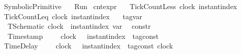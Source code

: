 %
\begin{isabellebody}%
%
%
\isadelimtheory
%
\endisadelimtheory
%
\isatagtheory
{}\isamarkupfalse%
\ SymbolicPrimitive\isanewline
\ \ \ Run\isanewline
\isanewline
{}%
\endisatagtheory
{\isafoldtheory}%
%
\isadelimtheory
\isanewline
%
\endisadelimtheory
{}\isamarkupfalse%
\ cnt{\isacharunderscore}expr\ {\isacharequal}\isanewline
\ \ TickCountLess\ {\isacartoucheopen}clock{\isacartoucheclose}\ {\isacartoucheopen}instant{\isacharunderscore}index{\isacartoucheclose}\ {\isacharparenleft}{\isachardoublequoteopen}{\isacharhash}\isactrlsup {\isacharless}{\isachardoublequoteclose}{\isacharparenright}\isanewline
{\isacharbar}\ TickCountLeq\ {\isacartoucheopen}clock{\isacartoucheclose}\ {\isacartoucheopen}instant{\isacharunderscore}index{\isacartoucheclose}\ \ {\isacharparenleft}{\isachardoublequoteopen}{\isacharhash}\isactrlsup {\isasymle}{\isachardoublequoteclose}{\isacharparenright}%
\isadelimdocument
%
\endisadelimdocument
%
\isatagdocument
%
\isamarkuptrue%
%
\endisatagdocument
{\isafolddocument}%
%
\isadelimdocument
%
\endisadelimdocument
{}\isamarkupfalse%
\ tag{\isacharunderscore}var\ {\isacharequal}\isanewline
\ \ TSchematic\ {\isacartoucheopen}clock\ {\isacharasterisk}\ instant{\isacharunderscore}index{\isacartoucheclose}\ {\isacharparenleft}{\isachardoublequoteopen}{\isasymtau}\isactrlsub v\isactrlsub a\isactrlsub r{\isachardoublequoteclose}{\isacharparenright}\isanewline
\isanewline
{}\isamarkupfalse%
\ {\isacharprime}{\isasymtau}\ constr\ {\isacharequal}\isanewline
\ \ Timestamp\ \ \ \ \ {\isacartoucheopen}clock{\isacartoucheclose}\ \ \ {\isacartoucheopen}instant{\isacharunderscore}index{\isacartoucheclose}\ {\isacartoucheopen}{\isacharprime}{\isasymtau}\ tag{\isacharunderscore}const{\isacartoucheclose}\ \ \ \ \ \ \ \ \ {\isacharparenleft}{\isachardoublequoteopen}{\isacharunderscore}\ {\isasymDown}\ {\isacharunderscore}\ {\isacharat}\ {\isacharunderscore}{\isachardoublequoteclose}{\isacharparenright}\isanewline
{\isacharbar}\ TimeDelay\ \ \ \ \ {\isacartoucheopen}clock{\isacartoucheclose}\ \ \ {\isacartoucheopen}instant{\isacharunderscore}index{\isacartoucheclose}\ {\isacartoucheopen}{\isacharprime}{\isasymtau}\ tag{\isacharunderscore}const{\isacartoucheclose}\ {\isacartoucheopen}clock{\isacartoucheclose}\ {\isacharparenleft}{\isachardoublequoteopen}{\isacharunderscore}\ {\isacharat}\ {\isacharunderscore}\ {\isasymoplus}\ {\isacharunderscore}\ {\isasymRightarrow}\ {\isacharunderscore}{\isachardoublequoteclose}{\isacharparenright}\isanewline

\end{isabellebody}
